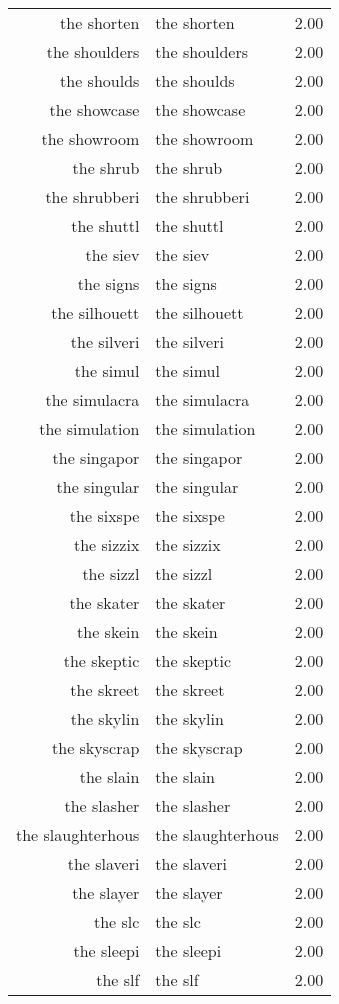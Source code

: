 \begin{table}[ht]
\begin{tabular}{rlr}
  the shorten & the shorten & 2.00 \\ 
  the shoulders & the shoulders & 2.00 \\ 
  the shoulds & the shoulds & 2.00 \\ 
  the showcase & the showcase & 2.00 \\ 
  the showroom & the showroom & 2.00 \\ 
  the shrub & the shrub & 2.00 \\ 
  the shrubberi & the shrubberi & 2.00 \\ 
  the shuttl & the shuttl & 2.00 \\ 
  the siev & the siev & 2.00 \\ 
  the signs & the signs & 2.00 \\ 
  the silhouett & the silhouett & 2.00 \\ 
  the silveri & the silveri & 2.00 \\ 
  the simul & the simul & 2.00 \\ 
  the simulacra & the simulacra & 2.00 \\ 
  the simulation & the simulation & 2.00 \\ 
  the singapor & the singapor & 2.00 \\ 
  the singular & the singular & 2.00 \\ 
  the sixspe & the sixspe & 2.00 \\ 
  the sizzix & the sizzix & 2.00 \\ 
  the sizzl & the sizzl & 2.00 \\ 
  the skater & the skater & 2.00 \\ 
  the skein & the skein & 2.00 \\ 
  the skeptic & the skeptic & 2.00 \\ 
  the skreet & the skreet & 2.00 \\ 
  the skylin & the skylin & 2.00 \\ 
  the skyscrap & the skyscrap & 2.00 \\ 
  the slain & the slain & 2.00 \\ 
  the slasher & the slasher & 2.00 \\ 
  the slaughterhous & the slaughterhous & 2.00 \\ 
  the slaveri & the slaveri & 2.00 \\ 
  the slayer & the slayer & 2.00 \\ 
  the slc & the slc & 2.00 \\ 
  the sleepi & the sleepi & 2.00 \\ 
  the slf & the slf & 2.00 \\ 

\end{tabular}
\end{table}
